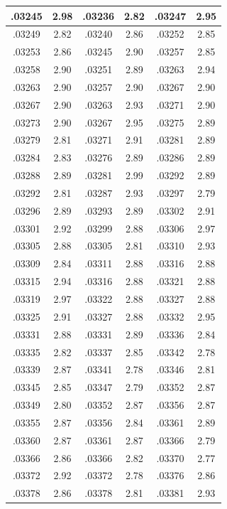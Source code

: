 \documentclass[11pt]{report}
\begin{document}
\begin{appendices}
\begin{longtable}{|c|c||c|c||c|c|}
.03245 & 2.98 & .03236 & 2.82 & .03247 & 2.95\\\hline
.03249 & 2.82 & .03240 & 2.86 & .03252 & 2.85\\\hline
.03253 & 2.86 & .03245 & 2.90 & .03257 & 2.85\\\hline
.03258 & 2.90 & .03251 & 2.89 & .03263 & 2.94\\\hline
.03263 & 2.90 & .03257 & 2.90 & .03267 & 2.90\\\hline
.03267 & 2.90 & .03263 & 2.93 & .03271 & 2.90\\\hline
.03273 & 2.90 & .03267 & 2.95 & .03275 & 2.89\\\hline
.03279 & 2.81 & .03271 & 2.91 & .03281 & 2.89\\\hline
.03284 & 2.83 & .03276 & 2.89 & .03286 & 2.89\\\hline
.03288 & 2.89 & .03281 & 2.99 & .03292 & 2.89\\\hline
.03292 & 2.81 & .03287 & 2.93 & .03297 & 2.79\\\hline
.03296 & 2.89 & .03293 & 2.89 & .03302 & 2.91\\\hline
.03301 & 2.92 & .03299 & 2.88 & .03306 & 2.97\\\hline
.03305 & 2.88 & .03305 & 2.81 & .03310 & 2.93\\\hline
.03309 & 2.84 & .03311 & 2.88 & .03316 & 2.88\\\hline
.03315 & 2.94 & .03316 & 2.88 & .03321 & 2.88\\\hline
.03319 & 2.97 & .03322 & 2.88 & .03327 & 2.88\\\hline
.03325 & 2.91 & .03327 & 2.88 & .03332 & 2.95\\\hline
.03331 & 2.88 & .03331 & 2.89 & .03336 & 2.84\\\hline
.03335 & 2.82 & .03337 & 2.85 & .03342 & 2.78\\\hline
.03339 & 2.87 & .03341 & 2.78 & .03346 & 2.81\\\hline
.03345 & 2.85 & .03347 & 2.79 & .03352 & 2.87\\\hline
.03349 & 2.80 & .03352 & 2.87 & .03356 & 2.87\\\hline
.03355 & 2.87 & .03356 & 2.84 & .03361 & 2.89\\\hline
.03360 & 2.87 & .03361 & 2.87 & .03366 & 2.79\\\hline
.03366 & 2.86 & .03366 & 2.82 & .03370 & 2.77\\\hline
.03372 & 2.92 & .03372 & 2.78 & .03376 & 2.86\\\hline
.03378 & 2.86 & .03378 & 2.81 & .03381 & 2.93\\\hline

\end{longtable}
\end{appendices}
\end{document}
